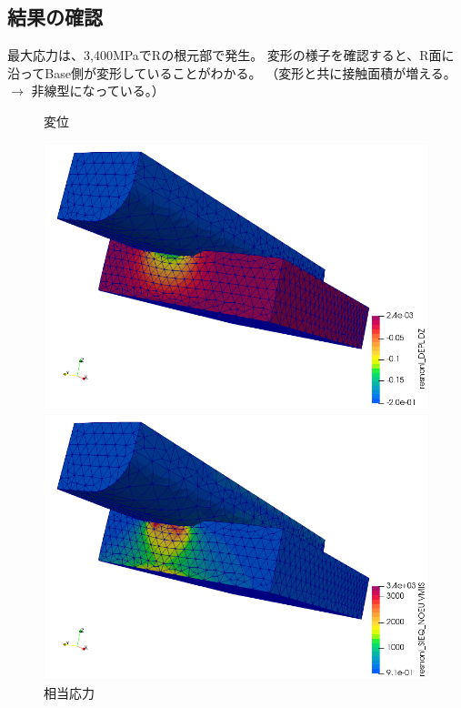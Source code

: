 \documentclass[a4j,11pt,twoside,openany,dvipdfmx]{jsarticle}
\begin{document}
\subsection{結果の確認}
最大応力は、3,400MPaでRの根元部で発生。
変形の様子を確認すると、R面に沿ってBase側が変形していることがわかる。
（変形と共に接触面積が増える。
$\rightarrow$
非線型になっている。）
\begin{figure}[H]
	\begin{minipage}{0.49\hsize}
		\captionsetup{labelformat=empty,labelsep=none}
		\caption{変位}
		\centering
		\includegraphics[width=0.9\linewidth]{fig/fig006.png}
	\end{minipage}
	\begin{minipage}{0.49\hsize}
		\captionsetup{labelformat=empty,labelsep=none}
		\caption{相当応力}
		\centering
		\includegraphics[width=0.9\linewidth]{fig/fig007.png}
	\end{minipage}
\end{figure}
\end{document}

